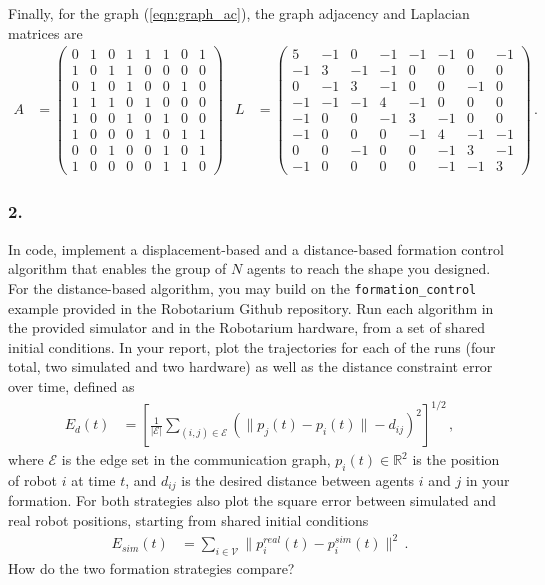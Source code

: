 \documentclass[11pt]{article}
\begin{document}
Finally, for the graph (\ref{eqn:graph_ac}), the graph adjacency and Laplacian matrices are
\begin{align}\label{eqn:al_ac}
    A&=\begin{pmatrix}
        0 &  1 &  0 &  1 &  1 & 1 & 0 & 1\\
        1 &  0 &  1 &  1 &  0 & 0 & 0 & 0\\
        0 &  1 &  0 &  1 &  0 & 0 & 1 & 0\\
        1 &  1 &  1 &  0 &  1 & 0 & 0 & 0\\
        1 &  0 &  0 &  1 &  0 & 1 & 0 & 0\\
        1 &  0 &  0 &  0 &  1 & 0 & 1 & 1\\
        0 &  0 &  1 &  0 &  0 & 1 & 0 & 1\\
        1 &  0 &  0 &  0 &  0 & 1 & 1 & 0
    \end{pmatrix} & L&=\begin{pmatrix}
         5 & -1 &  0 & -1 & -1 & -1 &  0 & -1\\
        -1 &  3 & -1 & -1 &  0 &  0 &  0 &  0\\
         0 & -1 &  3 & -1 &  0 &  0 & -1 &  0\\
        -1 & -1 & -1 &  4 & -1 &  0 &  0 &  0\\
        -1 &  0 &  0 & -1 &  3 & -1 &  0 &  0\\
        -1 &  0 &  0 &  0 & -1 &  4 & -1 & -1\\
         0 &  0 & -1 &  0 &  0 & -1 &  3 & -1\\
        -1 &  0 &  0 &  0 &  0 & -1 & -1 &  3
    \end{pmatrix}\,.
\end{align}

\FloatBarrier
\subsubsection*{2.}
In code, implement a displacement-based and a distance-based formation control algorithm that enables the group of $N$ agents to reach the shape you designed. For the distance-based algorithm, you may build on the \texttt{formation\_control} example provided in the Robotarium Github repository. Run each algorithm in the provided simulator and in the Robotarium hardware, from a set of shared initial conditions. In your report, plot the trajectories for each of the runs (four total, two simulated and two hardware) as well as the distance constraint error over time, defined as
\begin{align*}
    E_d(t)&=\left[\frac{1}{|\mathcal E|}\sum_{(i,j)\in\mathcal E}(\|p_j(t)-p_i(t)\|-d_{ij})^2\right]^{1/2}\,,
\end{align*}
where $\mathcal E$ is the edge set in the communication graph, $p_i(t)\in\mathbb R^2$ is the position of robot $i$ at time $t$, and $d_{ij}$ is the desired distance between agents $i$ and $j$ in your formation. For both strategies also plot the square error between simulated and real robot positions, starting from shared initial conditions
\begin{align*}
    E_{sim}(t)&=\sum_{i\in\mathcal V}\|p_i^{real}(t)-p_i^{sim}(t)\|^2\,.
\end{align*}
How do the two formation strategies compare?
\end{document}
